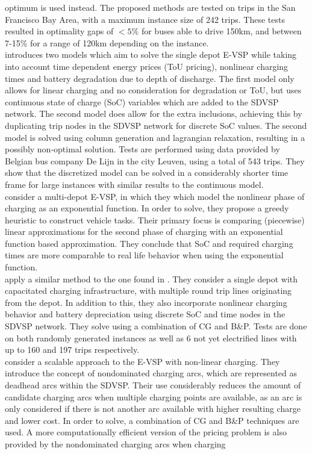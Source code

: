 \documentclass[]{article}
\makeatletter
\newcommand{\citetnl}[1]{%
  \@firstofone{\citet{#1}}}
\makeatother
\begin{document}
optimum is used instead. The proposed methods are tested on trips in the San Francisco Bay
Area, with a maximum instance size of 242 trips. These tests resulted in
optimality gaps of $<5\%$ for buses able to drive 150km, and between 7-15\%
for a range of 120km depending on the instance. \\
\citetnl{vanKootenNiekerk2017} introduces two models which aim to solve the single depot E-VSP
while taking into account time dependent energy prices (ToU pricing), nonlinear charging times and
battery degradation due to depth of discharge. The first model only allows for linear charging and no consideration for degradation or ToU, but uses continuous state of charge (SoC) variables which are added to the SDVSP network. The second model does allow for the extra inclusions, achieving this by duplicating trip nodes in the SDVSP network for discrete SoC values. The second model is solved using column generation and lagrangian relaxation, resulting in a possibly non-optimal solution. Tests are performed using data provided by Belgian bus company De Lijn in the city Leuven, using a total of 543 trips. They show that the
discretized model can be solved in a considerably shorter time frame for large instances with similar results to
the continuous model. \\
\citet{Olsen2020} consider a multi-depot E-VSP, in which they which model the nonlinear phase of charging as an exponential function. In order to solve, they propose a greedy heuristic to construct vehicle tasks. Their primary focus is comparing (piecewise) linear approximations for the second phase of charging with an exponential function based approximation. They conclude that SoC and required charging times are more comparable to real life behavior when using the exponential function. \\
\citet{Zhang2021} apply a similar method to the one found in . They consider a single depot with capacitated charging infrastructure,
with multiple round trip lines originating from the depot. In addition to this, they also incorporate nonlinear charging behavior and battery depreciation using discrete SoC and time nodes in the SDVSP network. They solve using a combination of CG and B\&P. Tests are done on both randomly generated instances as well as 6 not yet electrified lines with up to 160 and 197 trips
respectively.\\
\citet{Parmentier2023} consider a scalable approach to the E-VSP with non-linear charging. They introduce the concept of nondominated charging arcs, which are represented as deadhead arcs within the SDVSP. Their use considerably reduces the amount of candidate charging arcs when multiple charging points are available, as an arc is only considered if there is not another arc available with higher resulting charge and lower cost. In order to solve, a combination of CG and B\&P techniques are used. A more computationally efficient version of the pricing problem is also provided by the nondominated charging arcs when charging
\end{document}

